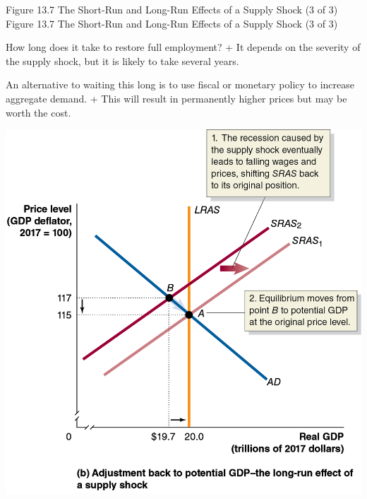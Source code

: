 \documentclass[
  12pt,
  ignorenonframetext,
]{beamer}
\begin{document}
\begin{frame}{Figure 13.7 The Short-Run and Long-Run Effects of a Supply
Shock (3 of 3)}
\protect\hypertarget{figure-13.7-the-short-run-and-long-run-effects-of-a-supply-shock-3-of-3}{}
Figure 13.7 The Short-Run and Long-Run Effects of a Supply Shock (3 of
3)

How long does it take to restore full employment? + It depends on the
severity of the supply shock, but it is likely to take several years.

An alternative to waiting this long is to use fiscal or monetary policy
to increase aggregate demand. + This will result in permanently higher
prices but may be worth the cost.

\includegraphics[width=\textwidth,height=0.99\textheight]{imgs3/img_slide39a.png}
\end{frame}
\end{document}

